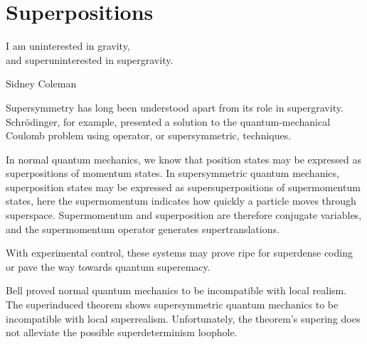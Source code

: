 \section{Superpositions}
\epigraph{I am uninterested in gravity,\\
and superuninterested in supergravity.}{Sidney Coleman\cite{vanNieuwenhuizen:2016}}

Supersymmetry has long been understood apart from its role in supergravity.
Schr\"{o}dinger, for example, presented a solution\cite{10.2307/20490744} to the quantum-mechanical Coulomb problem using operator, or supersymmetric, techniques\cite{RevModPhys.23.21}.

In normal quantum mechanics, we know that position states may be expressed as superpositions of momentum states.
In supersymmetric quantum mechanics, superposition states may be expressed as supersuperpositions of supermomentum states, here the supermomentum indicates how quickly a particle moves through superspace.
Supermomentum and superposition are therefore conjugate variables, and the supermomentum operator generates supertranslations.

With experimental control, these systems may prove ripe for superdense coding\cite{PhysRevLett.69.2881} or pave the way towards quantum superemacy\cite{Preskill:2012tg}.

Bell proved normal quantum mechanics to be incompatible with local realism\cite{bell1964einstein}.
The superinduced theorem shows supersymmetric quantum mechanics to be incompatible with local superrealism.
Unfortunately, the theorem's supering does not alleviate the possible superdeterminism loophole.